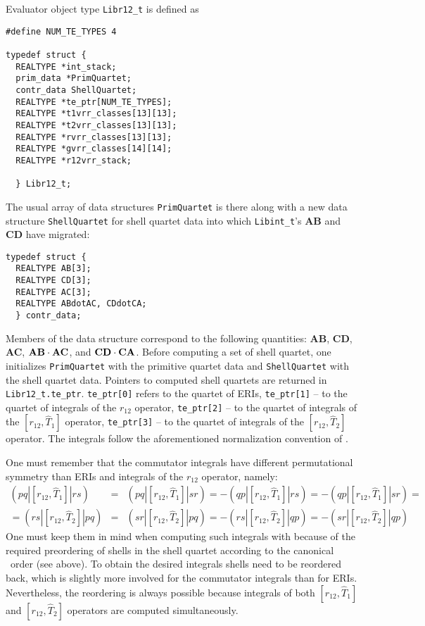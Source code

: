 \documentclass[12pt]{article}
\begin{document}
Evaluator object type {\tt Libr12\_t} is defined as
\begin{verbatim}
#define NUM_TE_TYPES 4

typedef struct {
  REALTYPE *int_stack;
  prim_data *PrimQuartet;
  contr_data ShellQuartet;
  REALTYPE *te_ptr[NUM_TE_TYPES];
  REALTYPE *t1vrr_classes[13][13];
  REALTYPE *t2vrr_classes[13][13];
  REALTYPE *rvrr_classes[13][13];
  REALTYPE *gvrr_classes[14][14];
  REALTYPE *r12vrr_stack;
  
  } Libr12_t;
\end{verbatim}
The usual array of data structures {\tt PrimQuartet} is there along with a new
data structure {\tt ShellQuartet} for shell quartet data into which {\tt Libint\_t}'s
{\bf AB} and {\bf CD} have migrated:
\begin{verbatim}
typedef struct {
  REALTYPE AB[3];
  REALTYPE CD[3];
  REALTYPE AC[3];
  REALTYPE ABdotAC, CDdotCA;
  } contr_data;
\end{verbatim}
Members of the data structure correspond to the following quantities:
{\bf AB}, {\bf CD}, {\bf AC}, ${\bf AB}\cdot{\bf AC}$, and ${\bf CD}\cdot{\bf CA}$.
Before computing a set of shell quartet, one initializes {\tt PrimQuartet} with the primitive quartet
data and {\tt ShellQuartet} with the shell quartet data. Pointers to computed shell quartets
are returned in {\tt Libr12\_t.te\_ptr}. {\tt te\_ptr[0]} refers to the quartet of ERIs,
{\tt te\_ptr[1]} -- to the quartet of integrals of the ${r_{12}}$ operator,
{\tt te\_ptr[2]} -- to the quartet of integrals of the $[r_{12},\hat{T}_1]$
operator, {\tt te\_ptr[3]} -- to the quartet of integrals of the $[r_{12},\hat{T}_2]$
operator. The integrals follow the aforementioned normalization convention of \LIBINT .

One must remember that the commutator integrals have different permutational symmetry
than ERIs and integrals of the $r_{12}$ operator, namely:
\begin{eqnarray}
(pq|[r_{12},\hat{T}_1]|rs) & = & (pq|[r_{12},\hat{T}_1]|sr) = -(qp|[r_{12},\hat{T}_1]|rs) = -(qp|[r_{12},\hat{T}_1]|sr) = \nonumber \\
= (rs|[r_{12},\hat{T}_2]|pq) & = &(sr|[r_{12},\hat{T}_2]|pq) = -(rs|[r_{12},\hat{T}_2]|qp) = -(sr|[r_{12},\hat{T}_2]|qp)
\end{eqnarray}
One must keep them in mind when computing such integrals with \librij because of the required
preordering of shells in the shell quartet according to the canonical \LIBINT\ order (see above).
To obtain the desired integrals shells need to be reordered back, which is slightly more involved
for the commutator integrals than for ERIs. Nevertheless, the reordering is always possible
because integrals of both $[r_{12},\hat{T}_1]$ and $[r_{12},\hat{T}_2]$ operators are computed simultaneously.
\end{document}
